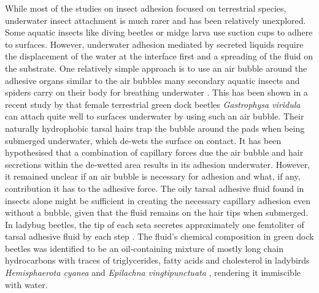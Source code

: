 \documentclass[vruler,JEB]{COB}%
\begin{document}
While most of the studies on insect adhesion focused on terrestrial species, underwater insect attachment is much rarer and has been relatively unexplored. Some aquatic insects like diving beetles \citep{Chen:2014} or midge larva \citep{Kang:2020} use suction cups to adhere to surfaces. However, underwater adhesion mediated by secreted liquids require the displacement of the water at the interface first and a spreading of the fluid on the substrate. One relatively simple approach is to use an air bubble around the adhesive organs similar to the air bubbles many secondary aquatic insects and spiders carry on their body for breathing underwater \citep{Seymour:2013}. This has been shown in a recent study by \citep{RN87} that female terrestrial green dock beetles \emph{Gastrophysa viridula} can attach quite well to surfaces underwater by using such an air bubble. Their naturally hydrophobic tarsal hairs trap the bubble around the pads when being submerged underwater, which de-wets the surface on contact. It has been hypothesised that a combination of capillary forces due the air bubble and hair secretions within the de-wetted area results in its adhesion underwater. However, it remained unclear if an air bubble is necessary for adhesion and what, if any, contribution it has to the adhesive force. The oily tarsal adhesive fluid found in insects alone might be sufficient in creating the necessary capillary adhesion even without a bubble, given that the fluid remains on the hair tips when submerged. In ladybug beetles, the tip of each seta secretes approximately one femtoliter of tarsal adhesive fluid by each step \citep{RN108}. The fluid's chemical composition in green dock beetles was identified to be an oil-containing mixture of mostly long chain hydrocarbons\citep{RN96} with traces
of triglycerides, fatty acids and cholesterol in ladybirds \emph{Hemisphaerota cyanea} \citep{RN221} and \emph{Epilachna vingtipunctuata} \citep{RN222}, rendering it immiscible with water.
\end{document}

